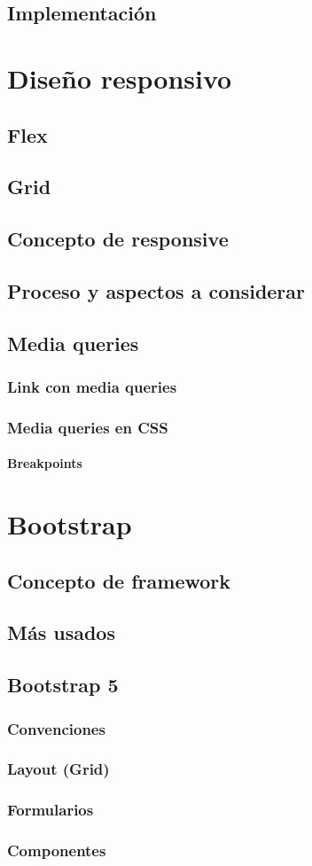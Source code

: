 \documentclass[12pt]{report}
\begin{document}
		\subsection{Implementación}
	\section{Diseño responsivo}
		\subsection{Flex}
		\subsection{Grid}
		\subsection{Concepto de responsive}
		\subsection{Proceso y aspectos a considerar}
		\subsection{Media queries}
			\subsubsection{Link con media queries}
			\subsubsection{Media queries en CSS}
				\paragraph{Breakpoints}
	\section{Bootstrap}	
		\subsection{Concepto de framework}
		\subsection{Más usados} %
		\subsection{Bootstrap 5}
			\subsubsection{Convenciones}
			\subsubsection{Layout (Grid)}
			\subsubsection{Formularios}
			\subsubsection{Componentes}
\end{document}
